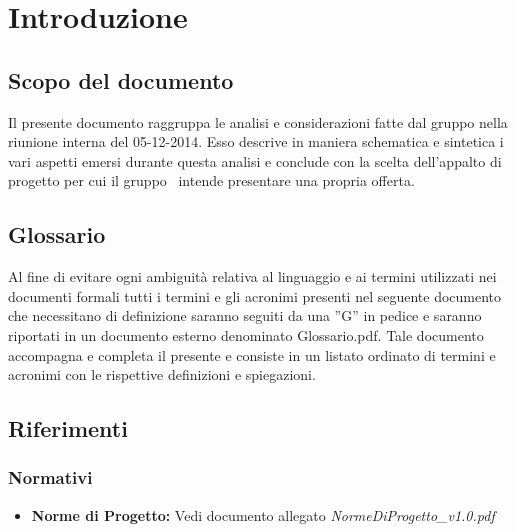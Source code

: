 \section{Introduzione}
\subsection{Scopo del documento}
Il presente documento raggruppa le analisi e considerazioni fatte dal gruppo nella
riunione interna del 05-12-2014. Esso descrive in maniera schematica e sintetica i
vari aspetti emersi durante questa analisi e conclude con la scelta dell'appalto di
progetto per cui il gruppo \gruppo\ intende presentare una propria offerta. 

\subsection{Glossario}

Al fine di evitare ogni ambiguità relativa al linguaggio e ai termini utilizzati nei documenti formali tutti i termini e gli acronimi presenti nel seguente documento che necessitano di definizione saranno seguiti da una ”G” in pedice e saranno riportati in un documento esterno denominato Glossario.pdf. Tale documento accompagna e completa il presente e consiste in un listato ordinato di termini e acronimi con le rispettive definizioni e spiegazioni.

\subsection{Riferimenti}
\subsubsection{Normativi}
\begin{itemize}
	\item \textbf{Norme di Progetto:} Vedi documento allegato \textit{NormeDiProgetto\_v1.0.pdf}
\end{itemize}
